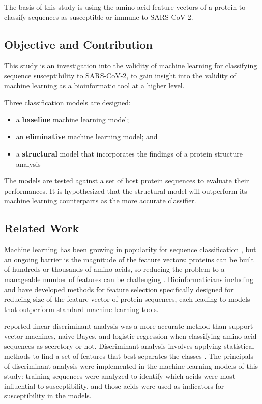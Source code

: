 The basis of this study is using the amino acid feature vectors of a protein to classify sequences as susceptible or immune to SARS-CoV-2.

\subsection{Objective and Contribution}

This study is an investigation into the validity of machine learning for classifying sequence susceptibility to SARS-CoV-2, to gain insight into the validity of machine learning as a bioinformatic tool at a higher level.

Three classification models are designed:
\begin{itemize}
    \setlength\itemsep{0em}
    \item a \textbf{baseline} machine learning model;
    \item an \textbf{eliminative} machine learning model; and
    \item a \textbf{structural} model that incorporates the findings of a protein structure analysis
\end{itemize}

The models are tested against a set of host protein sequences to evaluate their performances. It is hypothesized that the structural model will outperform its machine learning counterparts as the more accurate classifier.

\subsection{Related Work}

Machine learning has been growing in popularity for sequence classification \cite{Iqbal2014}, but an ongoing barrier is the magnitude of the feature vectors: proteins can be built of hundreds or thousands of amino acids, so reducing the problem to a manageable number of features can be challenging \cite{Saidi2010}. Bioinformaticians including \textcite{Iqbal2014} and \textcite{Saidi2010} have developed methods for feature selection specifically designed for reducing size of the feature vector of protein sequences, each leading to models that outperform standard machine learning tools.   

\textcite{Patel2016} reported linear discriminant analysis was a more accurate method than support vector machines, naive Bayes, and logistic regression when classifying amino acid sequences as secretory or not. Discriminant analysis involves applying statistical methods to find a set of features that best separates the classes \cite{Abdi2007}. The principals of discriminant analysis were implemented in the machine learning models of this study: training sequences were analyzed to identify which acids were most influential to susceptibility, and those acids were used as indicators for susceptibility in the models. 

